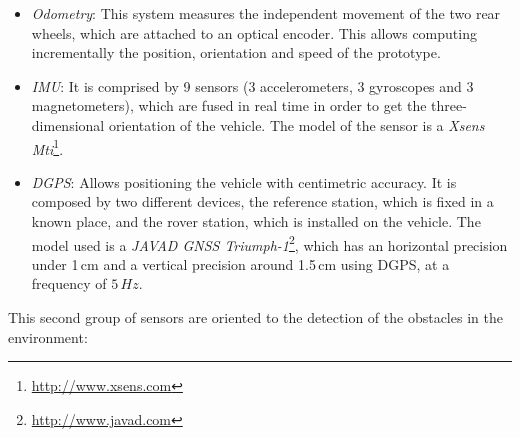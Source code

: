 \begin{itemize}
 \item \emph{Odometry}: This system measures the independent movement of the two rear wheels, which are attached to an optical encoder. This allows computing incrementally the position, orientation and speed of the prototype.
 \item \emph{\acf{IMU}}: It is comprised by 9 sensors (3 accelerometers, 3 gyroscopes and 3 magnetometers), which are fused in real time in order to get the three-dimensional orientation of the vehicle. The model of the sensor is a \emph{Xsens Mti}\footnote{\url{http://www.xsens.com}}.
 \item \emph{\acf{DGPS}}: Allows positioning the vehicle with centimetric accuracy. It is composed by two different devices, the reference station, which is fixed in a known place, and the rover station, which is installed on the vehicle. The model used is a \emph{JAVAD GNSS Triumph-1}\footnote{\url{http://www.javad.com}}, which has an horizontal precision under 1\,cm and a vertical precision around 1.5\,cm using \ac{DGPS}, at a frequency of $5\,Hz$.
\end{itemize}

This second group of sensors are oriented to the detection of the obstacles in the environment:

